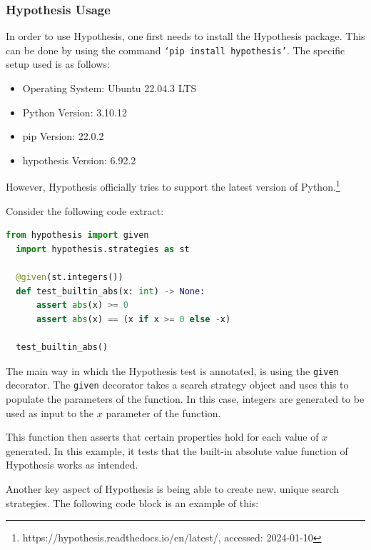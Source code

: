 \documentclass[runningheads]{llncs}
\begin{document}
\subsubsection{Hypothesis Usage}
In order to use Hypothesis, one first needs to install the Hypothesis package. This can be done by using the command \texttt{`pip install hypothesis'}. The specific setup used is as follows:

\begin{itemize}
  \item Operating System: Ubuntu 22.04.3 LTS
  \item Python Version: 3.10.12
  \item pip Version: 22.0.2
  \item hypothesis Version: 6.92.2
\end{itemize}
However, Hypothesis officially tries to support the latest version of Python.\footnote{https://hypothesis.readthedocs.io/en/latest/, accessed: 2024-01-10}

\vspace{5mm}
\noindent Consider the following code extract:
\begin{lstlisting}[language=Python,caption={Basic Test from code/tutorial.ipynb}]
  from hypothesis import given
  import hypothesis.strategies as st

  @given(st.integers())
  def test_builtin_abs(x: int) -> None:
      assert abs(x) >= 0
      assert abs(x) == (x if x >= 0 else -x)

  test_builtin_abs()
\end{lstlisting}
The main way in which the Hypothesis test is annotated, is using the \texttt{given} decorator. The \texttt{given} decorator takes a search strategy object and uses this to populate the parameters of the function. In this case, integers are generated to be used as input to the $x$ parameter of the function.

This function then asserts that certain properties hold for each value of $x$ generated. In this example, it tests that the built-in absolute value function of Hypothesis works as intended.

\vspace{5mm}
\noindent Another key aspect of Hypothesis is being able to create new, unique search strategies. The following code block is an example of this:
\end{document}
